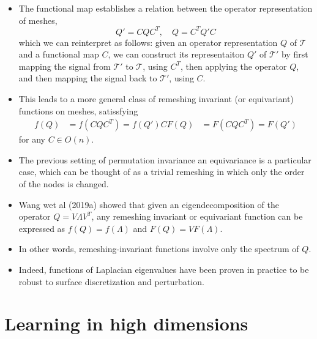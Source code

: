 \documentclass[12pt]{article}
\numberwithin{equation}{section}
\theoremstyle{definition}
\newcommand{		\eq		}[1]	{	\begin{align*}#1\end{align*}	}%
\newcommand{		\1		}	{	\bm{1}					}%
\begin{document}
\begin{itemize}
\item The functional map establishes a relation between the operator representation of meshes,
$$
Q' = CQC^T, \quad Q = C^T Q' C 
$$
which we can reinterpret as follows: given an operator representation $Q$ of $\mathcal{T}$ and a functional map $C$, we can construct its representaiton $Q'$ of $\mathcal{T}'$ by first mapping the signal from $\mathcal{T}'$ to $\mathcal{T}$, using $C^T$, then applying the operator $Q$, and then mapping the signal back to $\mathcal{T}'$, using $C$. 
\item This leads to a more general class of remeshing invariant (or equivariant) functions on meshes, satissfying
\eq{
f(Q) &= f(CQC^T) = f(Q')
CF(Q) &= F(CQC^T) = F(Q') 
}
for any $C \in O(n)$. 
\item The previous setting of permutation invariance an equivariance is a particular case, which can be thought of as a trivial remeshing in which only the order of the nodes is changed. 
\item Wang wet al (2019a) showed that given an eigendecomposition of the operator $Q = V \Lambda V^T$, any remeshing invariant or equivariant function can be expressed as 
$f(Q) = f(\Lambda)$ and $F(Q) = VF(\Lambda)$.
\item In other words, remeshing-invariant functions involve only the spectrum of $Q$. 
\item Indeed, functions of Laplacian eigenvalues have been proven in practice to be robust to surface discretization and perturbation. 

\end{itemize}

\newpage
\section{Learning in high dimensions}
\end{document}
